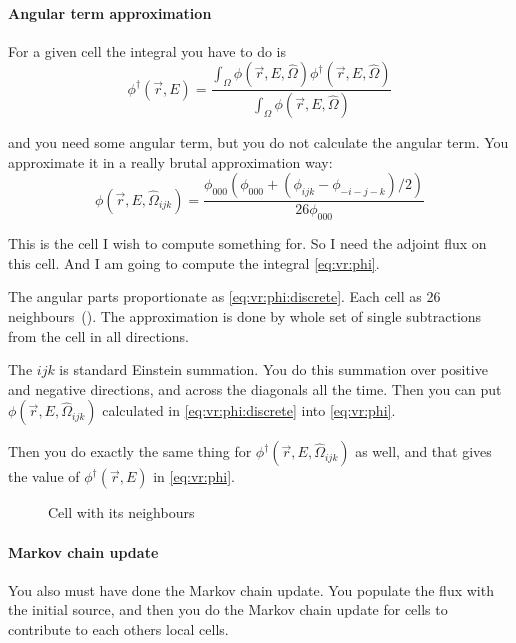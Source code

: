 \paragraph{Angular term approximation}

For a given cell the integral you have to do is 
\begin{equation}
\label{eq:vr:phi}
  \phi^\dag(\vec{r},E) = \frac{\int_\Omega \phi(\vec{r},E,\hat{\Omega})
    \phi^\dag(\vec{r},E,\hat{\Omega}) }
  {\int_\Omega \phi(\vec{r},E,\hat{\Omega}) }
\end{equation}

and you need some angular term, but you do not calculate the angular term. You approximate it in a really brutal approximation way:
\begin{equation}
  \label{eq:vr:phi:discrete}
  \phi(\vec{r},E,\hat\Omega_{ijk})=
  \frac{\phi_{000} (\phi_{000}+(\phi_{ijk} - \phi_{-i-j-k})/2) }
  { 26 \phi_{000} }
\end{equation}

This is the cell I wish to compute something for. So I need the adjoint flux on this cell.
And I am going to compute the integral \eqref{eq:vr:phi}.

The angular parts proportionate as \eqref{eq:vr:phi:discrete}.
Each cell as 26 neighbours~(). The approximation is done by whole set of single subtractions from the cell in all directions.

The $ijk$ is standard Einstein summation. You do this summation over positive and negative directions, and across the diagonals all the time.
Then you can put $\phi(\vec{r},E,\hat\Omega_{ijk})$ calculated in \eqref{eq:vr:phi:discrete} into \eqref{eq:vr:phi}.

Then you do exactly the same thing for $\phi^\dag(\vec{r},E,\hat\Omega_{ijk})$ as well, and that gives the value of 
$\phi^\dag(\vec{r},E)$ in \eqref{eq:vr:phi}.


\begin{figure}
  \centering
  
  \caption{Cell with its neighbours}
  \label{fig:vr:cell}
\end{figure}

\paragraph{Markov chain update}
You also must have done the Markov chain update. You populate the flux with the initial source, and then you do the Markov chain update for cells to contribute to each others local cells.

